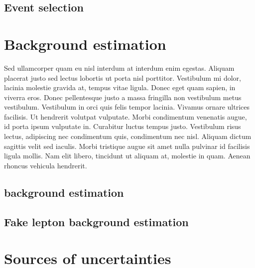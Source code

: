 \subsection{Event selection}
\label{sec:event-selection}

\section{Background estimation}
\label{sec:background-estimation}

Sed ullamcorper quam eu nisl interdum at interdum enim egestas. Aliquam placerat justo sed lectus lobortis ut porta nisl porttitor. Vestibulum mi dolor, lacinia molestie gravida at, tempus vitae ligula. Donec eget quam sapien, in viverra eros. Donec pellentesque justo a massa fringilla non vestibulum metus vestibulum. Vestibulum in orci quis felis tempor lacinia. Vivamus ornare ultrices facilisis. Ut hendrerit volutpat vulputate. Morbi condimentum venenatis augue, id porta ipsum vulputate in. Curabitur luctus tempus justo. Vestibulum risus lectus, adipiscing nec condimentum quis, condimentum nec nisl. Aliquam dictum sagittis velit sed iaculis. Morbi tristique augue sit amet nulla pulvinar id facilisis ligula mollis. Nam elit libero, tincidunt ut aliquam at, molestie in quam. Aenean rhoncus vehicula hendrerit.

\subsection{\efake background estimation}
\label{sec:background-estimation-efake}

\subsection{Fake lepton background estimation}
\label{sec:background-estimation-lfake}



\section{Sources of uncertainties}
\label{sec:sources-of-uncertainties}

